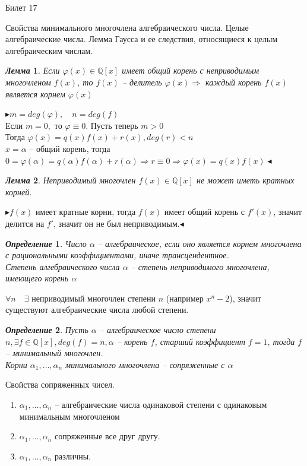 \documentclass[a4paper,12pt]{article}
\newtheorem{deff}{\textit{Определение}}
\newtheorem{lem}{\textit{Лемма}}
\newcommand{\ee}{\equiv}
\newcommand{\FI}{\varphi}
\newcommand{\AL}{\alpha}
\newcommand{\q}{\quad}
\newcommand{\pb}{\blacktriangleright}
\newcommand{\pe}{\blacktriangleleft}
\newcommand{\Ra}{\Rightarrow}
\newcommand{\bb}[1]{\mathbb{#1}}
\begin{document}
\newpage
\begin{mybox}{\hypertarget{bil17}{Билет 17}}

\begin{formbox}{}
Свойства минимального многочлена алгебраического числа. Целые алгебраические числа. Лемма Гаусса и ее следствия, относящиеся к целым алгебраическим числам.
\end{formbox}
\begin{formbox}{}
\begin{lem} Если $\FI(x)\in\bb{Q}[x]   $ имеет общий корень с неприводимым многочленом $f(x)$, то $f(x)$ -- делитель $\FI(x)\Ra $ каждый корень $f(x)$ является корнем $\FI(x)$
\end{lem}
\end{formbox}
$\pb m = deg(\FI), \q n = deg(f)$\\
Если $m = 0,$ то $\FI\ee 0$. Пусть теперь $m > 0$\\
Тогда $\FI(x) = q(x)f(x) + r(x), deg(r) < n$\\
$x = \AL$ -- общий корень, тогда $0 = \FI(\AL) = q(\AL)f(\AL) + r(\AL) \Ra r \ee 0 \Ra \FI(x) = q(x)f(x)  \pe$ 

\begin{formbox}{}
\begin{lem} Неприводимый многочлен $f(x)\in\bb{Q}[x]$ не может иметь кратных корней.
\end{lem}
\end{formbox}
$\pb f(x)$ имеет кратные корни, тогда $f(x)$ имеет общий корень с $f'(x)$, значит делится на $f'$, значит он не был неприводимым.$\pe$ 

\begin{formbox}{}
\begin{deff} Число $\AL$ -- алгебраическое, если оно является корнем многочлена с рациональными коэффициентами, иначе трансцендентное.\\
Степень алгебраического числа $\AL$ -- степень неприводимого многочлена, имеющего корень $\AL$
\end{deff}
\end{formbox}

$\forall n \q\exists$ неприводимый многочлен степени $n$ (например $x^n - 2$), значит существуют алгебраические числа любой степени.

\begin{formbox}{}
\begin{deff} Пусть $\AL$ -- алгебраическое число степени $n, \exists f\in\bb{Q}[x], deg(f) = n, \AL$ -- корень $f$, старший коэффициент $f = 1$, тогда $f$ -- минимальный многочлен.\\
Корни $\AL_1,\dots,\AL_n$ минимального многочлена -- сопряженные с $\AL$ 
\end{deff}
\end{formbox}
Свойства сопряженных чисел.\\
\begin{enumerate}
\item $\AL_1,\dots,\AL_n$ -- алгебраические числа одинаковой степени с одинаковым минимальным многочленом
\item $\AL_1,\dots,\AL_n$  сопряженные все друг другу.
\item $\AL_1,\dots,\AL_n$ различны.
\end{enumerate}


\end{mybox}
\end{document}

